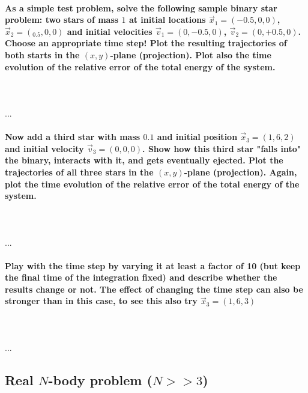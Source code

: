     \paragraph{As a simple test problem, solve the following sample binary 
        star problem: two stars of mass $1$ at initial locations 
        $\vec x_1=(-0.5,0,0)$, $\vec x_2=(_0.5,0,0)$ and initial velocities
        $\vec v_1=(0,-0.5,0)$, $\vec v_2=(0,+0.5,0)$. Choose an appropriate
        time step! Plot the resulting trajectories of both starts in the 
        $(x,y)$-plane (projection). Plot also the time evolution of the 
        relative error of the total energy of the system.
    } \ \\
        \\
        ...
    
    \paragraph{Now add a third star with mass $0.1$ and initial position 
        $\vec x_3=(1,6,2)$ and initial velocity $\vec v_3=(0,0,0)$. Show how 
        this third star "falls into" the binary, interacts with it, and gets 
        eventually ejected. Plot the trajectories of all three stars in the 
        $(x,y)$-plane (projection). Again, plot the time evolution of the 
        relative error of the total energy of the system.
    } \ \\
        \\
        ... 
    
    \paragraph{Play with the time step by varying it at least a factor of 10 
        (but keep the final time of the integration fixed) and describe whether 
        the results change or not. The effect of changing the time step can 
        also be stronger than in this case, to see this also try 
        $\vec x_3=(1,6,3)$
    } \ \\
        \\
        ...

\subsection{Real $N$-body problem ($N>>3$)}
